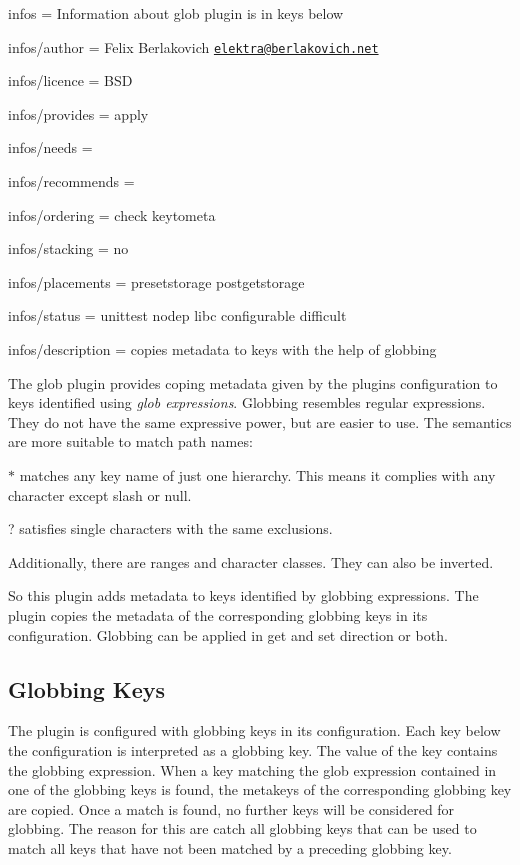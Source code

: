 
\begin{DoxyItemize}
\item infos = Information about glob plugin is in keys below
\item infos/author = Felix Berlakovich \href{mailto:elektra@berlakovich.net}{\tt elektra@berlakovich.\+net}
\item infos/licence = B\+SD
\item infos/provides = apply
\item infos/needs =
\item infos/recommends =
\item infos/ordering = check keytometa
\item infos/stacking = no
\item infos/placements = presetstorage postgetstorage
\item infos/status = unittest nodep libc configurable difficult
\item infos/description = copies metadata to keys with the help of globbing
\end{DoxyItemize}

The glob plugin provides coping metadata given by the plugin\textquotesingle{}s configuration to keys identified using {\itshape glob expressions}. Globbing resembles regular expressions. They do not have the same expressive power, but are easier to use. The semantics are more suitable to match path names\+:


\begin{DoxyItemize}
\item {\ttfamily $\ast$} matches any key name of just one hierarchy. This means it complies with any character except slash or null.
\item {\ttfamily ?} satisfies single characters with the same exclusions.
\item Additionally, there are ranges and character classes. They can also be inverted.
\end{DoxyItemize}

So this plugin adds metadata to keys identified by globbing expressions. The plugin copies the metadata of the corresponding globbing keys in its configuration. Globbing can be applied in get and set direction or both.

\subsection*{Globbing Keys}

The plugin is configured with globbing keys in its configuration. Each key below the configuration is interpreted as a globbing key. The value of the key contains the globbing expression. When a key matching the glob expression contained in one of the globbing keys is found, the metakeys of the corresponding globbing key are copied. Once a match is found, no further keys will be considered for globbing. The reason for this are catch all globbing keys that can be used to match all keys that have not been matched by a preceding globbing key.


